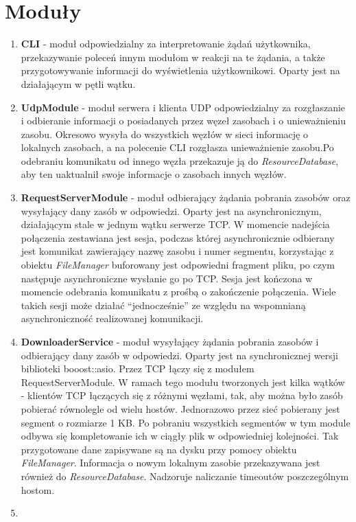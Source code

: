 \documentclass[11pt,oneside]{book}
\newcommand{\+}{\discretionary{\mbox{\scriptsize$\hookleftarrow$}}{}{}}
\begin{document}
\section{Moduły}
\begin{enumerate}
	\item 
\textbf{CLI} - moduł odpowiedzialny za interpretowanie żądań użytkownika, przekazywanie poleceń innym modułom w reakcji na te żądania, a także przygotowywanie informacji do wyświetlenia użytkownikowi. Oparty jest na działającym w pętli wątku.
	\item 
\textbf{UdpModule} - moduł serwera i klienta UDP odpowiedzialny za rozgłaszanie i odbieranie informacji o posiadanych przez węzeł zasobach i o unieważnieniu zasobu. Okresowo wysyła do wszystkich węzłów w sieci informację o lokalnych zasobach, a na polecenie CLI rozgłasza unieważnienie zasobu.Po odebraniu komunikatu od innego węzła przekazuje ją do \textit{ResourceDatabase}, aby ten uaktualnił swoje informacje o zasobach innych węzłów.
	\item 
\textbf{RequestServerModule} - moduł odbierający żądania pobrania zasobów oraz wysyłający dany zasób w odpowiedzi. Oparty jest na asynchronicznym, działającym stale w jednym wątku serwerze TCP. W momencie nadejścia połączenia zestawiana jest sesja, podczas której asynchronicznie odbierany jest komunikat zawierający nazwę zasobu i numer segmentu, korzystając z obiektu \textit{FileManager} buforowany jest odpowiedni fragment pliku, po czym następuje asynchroniczne wysłanie go po TCP. Sesja jest kończona w momencie odebrania komunikatu z prośbą o zakończenie połączenia. Wiele takich sesji może działać “jednocześnie” ze względu na wspomnianą asynchroniczność realizowanej komunikacji.
	\item 
\textbf{DownloaderService} - moduł wysyłający żądania pobrania zasobów i odbierający dany zasób w odpowiedzi. Oparty jest na synchronicznej wersji biblioteki booost::asio. Przez TCP łączy się z modułem RequestServerModule. W ramach tego modułu tworzonych jest kilka wątków - klientów TCP łączących się z różnymi węzłami, tak, aby można było zasób pobierać równolegle od wielu hostów. Jednorazowo przez sieć pobierany jest segment o rozmiarze 1 KB. Po pobraniu wszystkich segmentów w tym module odbywa się kompletowanie ich w ciągły plik w odpowiedniej kolejności. Tak przygotowane dane zapisywane są na dysku przy pomocy obiektu \textit{FileManager}. Informacja o nowym lokalnym zasobie przekazywana jest również do \textit{ResourceDatabase}. Nadzoruje naliczanie timeoutów poszczególnym hostom.
	\item 

\end{enumerate}
\end{document}
